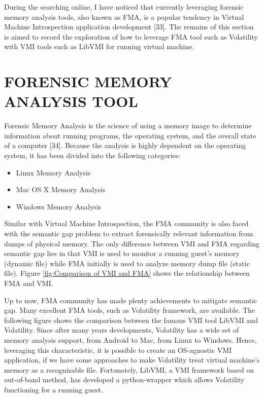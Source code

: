 During the searching online, I have noticed that currently leveraging forensic memory analysis tools, also known as FMA, is a popular tendency in Virtual Machine Introspection application development [33]. The remains of this section is aimed to record the exploration of how to leverage FMA tool such as Volatility with VMI tools such as LibVMI for running virtual machine.

\section{FORENSIC MEMORY ANALYSIS TOOL}
Forensic Memory Analysis is the science of using a memory image to determine information about running programs, the operating system, and the overall state of a computer [34]. Because the analysis is highly dependent on the operating system, it has been divided into the following categories:
\begin{itemize}
    \item Linux Memory Analysis
    \item Mac OS X Memory Analysis
    \item Windows Memory Analysis
\end{itemize}
Similar with Virtual Machine Introspection, the FMA community is also faced with the semantic gap problem to extract 
forensically relevant information from dumps of physical memory. The only difference between VMI and FMA regarding 
semantic gap lies in that VMI is used to monitor a running guest’s memory (dynamic file) while FMA initially is used to 
analyze memory dump file (static file). Figure \ref{fig:Comparison of VMI and FMA} shows the relationship between FMA and VMI.

Up to now, FMA community has made plenty achievements to mitigate semantic gap. Many excellent FMA tools, such as Volatility framework, are available. The following figure shows the comparison between the famous VMI tool LibVMI and Volatility. Since after many years developments, Volatility has a wide set of memory analysis support, from Android to Mac, from Linux to Windows. Hence, leveraging this characteristic, it is possible to create an OS-agnostic VMI application, if we have some approaches to make Volatility treat virtual machine’s memory as a recognizable file. Fortunately, LibVMI, a VMI framework based on out-of-band method, has developed a python-wrapper which allows Volatility functioning for a running guest.

